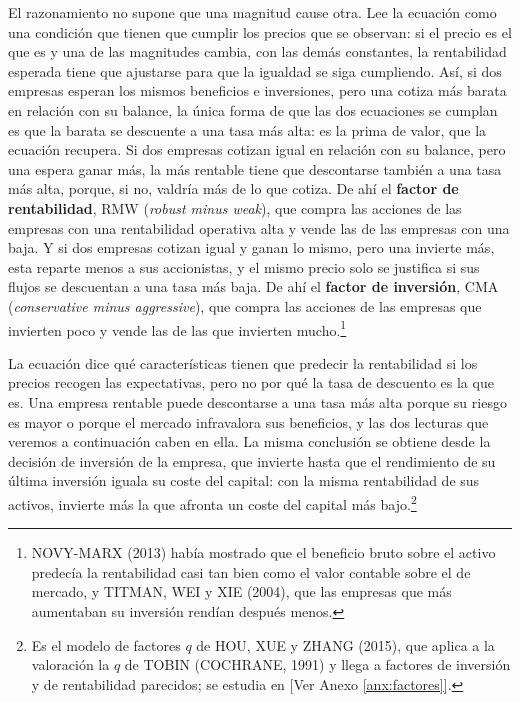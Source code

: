 \documentclass[10pt,a4paper]{article}
\newcommand{\authorfont}[1]{{\fontfamily{EBGaramond-TLF}\selectfont #1}}
\begin{document}
El razonamiento no supone que una magnitud cause otra. Lee la ecuación como una condición que tienen que cumplir los precios que se observan: si el precio es el que es y una de las magnitudes cambia, con las demás constantes, la rentabilidad esperada tiene que ajustarse para que la igualdad se siga cumpliendo. Así, si dos empresas esperan los mismos beneficios e inversiones, pero una cotiza más barata en relación con su balance, la única forma de que las dos ecuaciones se cumplan es que la barata se descuente a una tasa más alta: es la prima de valor, que la ecuación recupera. Si dos empresas cotizan igual en relación con su balance, pero una espera ganar más, la más rentable tiene que descontarse también a una tasa más alta, porque, si no, valdría más de lo que cotiza. De ahí el \textbf{factor de rentabilidad}, RMW (\textit{robust minus weak}), que compra las acciones de las empresas con una rentabilidad operativa alta y vende las de las empresas con una baja. Y si dos empresas cotizan igual y ganan lo mismo, pero una invierte más, esta reparte menos a sus accionistas, y el mismo precio solo se justifica si sus flujos se descuentan a una tasa más baja. De ahí el \textbf{factor de inversión}, CMA (\textit{conservative minus aggressive}), que compra las acciones de las empresas que invierten poco y vende las de las que invierten mucho.\footnote{%
    NOVY-MARX (2013) había mostrado que el beneficio bruto sobre el activo predecía la rentabilidad casi tan bien como el valor contable sobre el de mercado, y TITMAN, WEI y XIE (2004), que las empresas que más aumentaban su inversión rendían después menos.
}

La ecuación dice qué características tienen que predecir la rentabilidad si los precios recogen las expectativas, pero no por qué la tasa de descuento es la que es. Una empresa rentable puede descontarse a una tasa más alta porque su riesgo es mayor o porque el mercado infravalora sus beneficios, y las dos lecturas que veremos a continuación caben en ella. La misma conclusión se obtiene desde la decisión de inversión de la empresa, que invierte hasta que el rendimiento de su última inversión iguala su coste del capital: con la misma rentabilidad de sus activos, invierte más la que afronta un coste del capital más bajo.\footnote{%
    Es el modelo de factores $q$ de HOU, XUE y ZHANG (2015), que aplica a la valoración la $q$ de TOBIN (COCHRANE, 1991) y llega a factores de inversión y de rentabilidad parecidos; se estudia en [\authorfont{Ver Anexo \ref{anx:factores}}].
}
\end{document}
